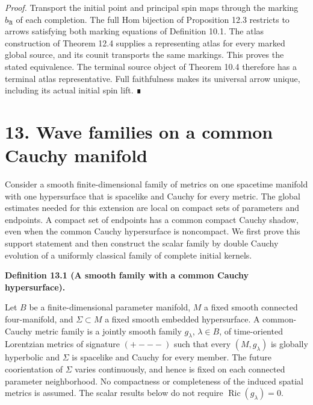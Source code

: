 \documentclass[
  english,
  11pt,
  reqno]{amsart}
\makeatletter
\newcommand{\pandocstatementheading}[1]{%
  \par\addpenalty{\@beginparpenalty}%
  \addvspace{.5\baselineskip plus .2\baselineskip minus .2\baselineskip}%
  {\normalfont\bfseries #1\par}%
  \nobreak\@afterindenttrue\@afterheading
}
\newcommand{\paperblockheading}[2][.45\baselineskip]{%
  \par\Needspace{6\baselineskip}%
  \addvspace{\baselineskip}%
  \noindent{\normalfont\bfseries #2}\par\nobreak
  \vskip#1\relax\nobreak
}
\makeatother
\begin{document}
\emph{Proof.} Transport the initial point and principal spin maps
through the marking \(b_{\mathfrak A}\) of each completion. The full Hom
bijection of Proposition 12.3 restricts to arrows satisfying both
marking equations of Definition 10.1. The atlas construction of Theorem
12.4 supplies a representing atlas for every marked global source, and
its counit transports the same markings. This proves the stated
equivalence. The terminal source object of Theorem 10.4 therefore has a
terminal atlas representative. Full faithfulness makes its universal
arrow unique, including its actual initial spin lift. ∎

\protect{}\label{sec:common-cauchy-wave-families}

\section{13. Wave families on a common Cauchy
manifold}\label{wave-families-on-a-common-cauchy-manifold}

Consider a smooth finite-dimensional family of metrics on one spacetime
manifold with one hypersurface that is spacelike and Cauchy for every
metric. The global estimates needed for this extension are local on
compact sets of parameters and endpoints. A compact set of endpoints has
a common compact Cauchy shadow, even when the common Cauchy hypersurface
is noncompact. We first prove this support statement and then construct
the scalar family by double Cauchy evolution of a uniformly classical
family of complete initial kernels.

\paperblockheading[0pt]{Common causal control.}

\pandocstatementheading{\protect{}\label{def:common-cauchy-metric-family}Definition 13.1 (A smooth family with a common Cauchy hypersurface).}

Let \(B\) be a finite-dimensional parameter manifold, \(M\) a fixed
smooth connected four-manifold, and \(\Sigma\subset M\) a fixed smooth
embedded hypersurface. A common-Cauchy metric family is a jointly smooth
family \(g_\lambda\), \(\lambda\in B\), of time-oriented Lorentzian
metrics of signature \((+---)\) such that every \((M,g_\lambda)\) is
globally hyperbolic and \(\Sigma\) is spacelike and Cauchy for every
member. The future coorientation of \(\Sigma\) varies continuously, and
hence is fixed on each connected parameter neighborhood. No compactness
or completeness of the induced spatial metrics is assumed. The scalar
results below do not require \(\operatorname{Ric}(g_\lambda)=0\).
\end{document}
